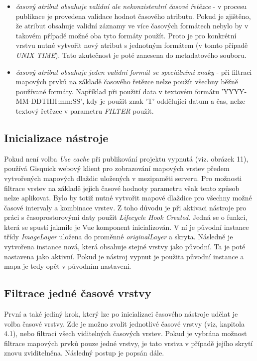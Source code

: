 \begin{itemize}
	\item\textit{časový atribut obsahuje validní ale nekonzistentní časové řetězce} - v procesu publikace je provedena validace hodnot časového atributu. Pokud je zjištěno, že atribut obsahuje validní záznamy ve více časových formátech nebylo by v takovém případě možné oba tyto formáty použít. Proto je pro konkrétní vrstvu nutné vytvořit nový atribut s jednotným formátem (v tomto případě \textit{UNIX TIME}). Tato zkutečnost je poté zanesena do metadatového souboru.
	\item\textit{časový atribut obsahuje jeden validní formát se speciálními znaky} - při filtraci mapových prvků na základě časového řetězce nelze použít všechny běžně používané formáty. Například při použití data v textovém formátu 'YYYY-MM-DDTHH:mm:SS', kdy je použit znak 'T' oddělující datum a čas, nelze textový řetězec v parametru \textit{FILTER} použít.
\end{itemize}

\subsection{Inicializace nástroje}

Pokud není volba \textit{Use cache} při publikování projektu vypnutá (viz. obrázek 11),  používá Gisquick webový klient pro zobrazování mapových vrstev předem vytvořených mapových dlaždic uložených v mezipaměti serveru. Pro možnosti filtrace vrstev na základě jejich časové hodnoty parametru však tento způsob nelze aplikovat. Bylo by totiž nutné vytvořit mapové dlaždice pro všechny možné časové intervaly a kombinace vrstev. Z toho důvodu je při aktivaci nástroje pro práci s časoprostorovými daty použit \textit{Lifecycle Hook Created}. Jedná se o funkci, která se spustí jakmile je Vue komponent inicializován. V ní je původní instance třídy \textit{ImageLayer} uložena do proměnné \textit{originalLayer} a skryta. Následně je vytvořena instance nová, která obsahuje stejné vrstvy jako původní. Ta je poté nastavena jako aktivní. Pokud je nástroj vypnut je použita původní instance a mapa je tedy opět v původním nastavení.

\subsection{Filtrace jedné časové vrstvy}

První a také jediný krok, který lze po inicializaci časového nástroje udělat je volba časové vrstvy. Zde je možno zvolit jednotlivé časové vrstvy (viz, kapitola 4.1), nebo filtraci všech viditelných časových vrstev. Pokud je vybrána možnost filtrace mapových prvků pouze jedné vrstvy, je tato vrstva v případě jejího skrytí znovu zviditelněna. Následný postup je popsán dále. 


